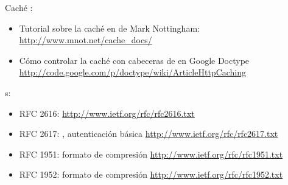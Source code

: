 \noindent Caché :

\begin{itemize}

\item Tutorial sobre la caché en  de Mark Nottingham: \newline \href{http://www.mnot.net/cache\_docs/}{http://www.mnot.net/cache\_docs/}

\item Cómo controlar la caché con cabeceras de  en Google Doctype \newline \href{http://code.google.com/p/doctype/wiki/ArticleHttpCaching}{http://code.google.com/p/doctype/wiki/ArticleHttpCaching}

\end{itemize} 

s:

\begin{itemize}

\item RFC 2616:  \newline \href{http://www.ietf.org/rfc/rfc2616.txt}{http://www.ietf.org/rfc/rfc2616.txt}
\item RFC 2617: , autenticación básica \newline \href{http://www.ietf.org/rfc/rfc2617.txt}{http://www.ietf.org/rfc/rfc2617.txt}
\item RFC 1951: formato de compresión  \newline \href{http://www.ietf.org/rfc/rfc1951.txt}{http://www.ietf.org/rfc/rfc1951.txt}
\item RFC 1952: formato de compresión  \newline \href{http://www.ietf.org/rfc/rfc1952.txt}{http://www.ietf.org/rfc/rfc1952.txt}

\end{itemize} 

